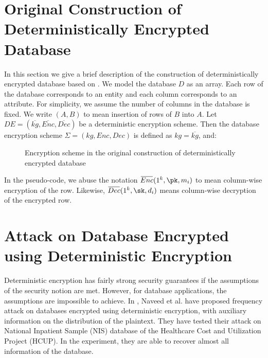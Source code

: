 \section{Original Construction of Deterministically Encrypted Database}
In this section we give a brief description of the construction of deterministically encrypted database based on \cite{Bellare2007}. We model the database $D$ as an array. Each row of the database corresponds to an entity and each column corresponds to an attribute. For simplicity, we assume the number of columns in the database is fixed. We write $(A, B)$ to mean insertion of rows of $B$ into $A$. Let $DE = (\overbar{kg}, \overbar{Enc}, \overbar{Dec})$ be a deterministic encryption scheme. Then the database encryption scheme $\Sigma = (kg, Enc, Dec)$ is defined as $kg = \overbar{kg}$, and:

\begin{figure}[H]
	\begin{center}
		\begin{pchstack}
			
			\pchspace
		\end{pchstack}
	\end{center}
	\caption{Encryption scheme in the original construction of deterministically encrypted database}
\end{figure}
In the pseudo-code, we abuse the notation $\overbar{Enc}(1^k, \pk, m_i)$ to mean column-wise encryption of the row. Likewise, $\overbar{Dec}(1^k, \sk, d_i)$ means column-wise decryption of the encrypted row.




\section{Attack on Database Encrypted using Deterministic Encryption}
Deterministic encryption has fairly strong security guarantees if the assumptions of the security notion are met. However, for database applications, the assumptions are impossible to achieve. In \cite{Naveed:2015:IAP:2810103.2813651}, Naveed et al. have proposed frequency attack on databases encrypted using deterministic encryption, with auxiliary information on the distribution of the plaintext. They have tested their attack on National Inpatient Sample (NIS) database of the Healthcare Cost and Utilization Project (HCUP). In the experiment, they are able to recover almost all information of the database.

